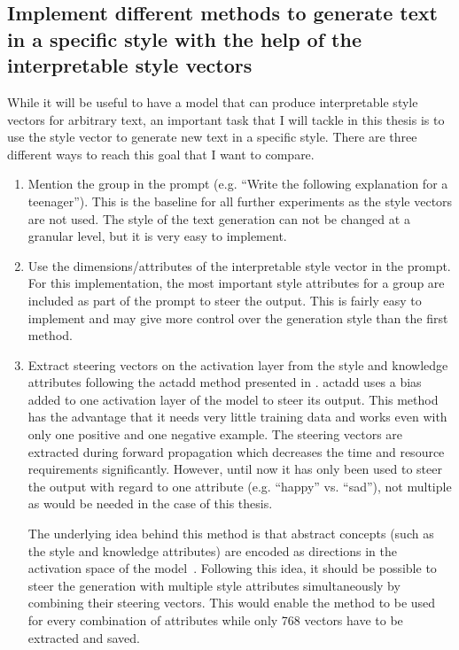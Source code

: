 \subsection{Implement different methods to generate text in a specific style with the help of the interpretable style vectors}
While it will be useful to have a model that can produce interpretable style vectors for arbitrary text, an important task that I will tackle in this thesis is to use the style vector to generate new text in a specific style. There are three different ways to reach this goal that I want to compare.
\begin{enumerate}
	\item
	      Mention the group in the prompt (e.g. \enquote{Write the following explanation for a teenager}). This is the baseline for all further experiments as the style vectors are not used. The style of the text generation can not be changed at a granular level, but it is very easy to implement.
	\item
	      Use the dimensions/attributes of the interpretable style vector in the prompt. For this implementation, the most important style attributes for a group are included as part of the prompt to steer the output. This is fairly easy to implement and may give more control over the generation style than the first method.
	\item
	      Extract steering vectors on the activation layer from the style and knowledge attributes following the \ac{actadd} method presented in \citet{turnerActivationAdditionSteering2024}. \Ac{actadd} uses a bias added to one activation layer of the model to steer its output. This method has the advantage that it needs very little training data and works even with only one positive and one negative example. The steering vectors are extracted during forward propagation which decreases the time and resource requirements significantly. However, until now it has only been used to steer the output with regard to one attribute (e.g. \enquote{happy} vs. \enquote{sad}), not multiple as would be needed in the case of this thesis.

	      The underlying idea behind this method is that abstract concepts (such as the style and knowledge attributes) are encoded as directions in the activation space of the model~\cite{parkLinearRepresentationHypothesis2024,rimsky-etal-2024-steering}. Following this idea, it should be possible to steer the generation with multiple style attributes simultaneously by combining their steering vectors. This would enable the method to be used for every combination of attributes while only 768 vectors have to be extracted and saved.
\end{enumerate}

